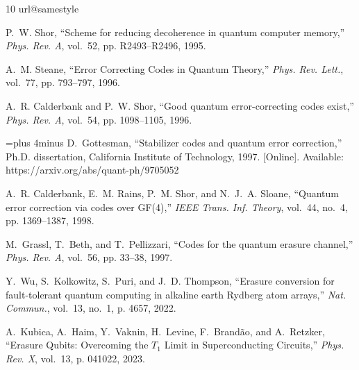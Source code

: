 \documentclass[]{amsart}
\begin{document}
\begin{thebibliography}{10}
\providecommand{\url}[1]{#1}
\csname url@samestyle\endcsname
\providecommand{\newblock}{\relax}
\providecommand{\bibinfo}[2]{#2}
\providecommand{\BIBentrySTDinterwordspacing}{\spaceskip=0pt\relax}
\providecommand{\BIBentryALTinterwordstretchfactor}{4}
\providecommand{\BIBentryALTinterwordspacing}{\spaceskip=\fontdimen2\font plus
\BIBentryALTinterwordstretchfactor\fontdimen3\font minus \fontdimen4\font\relax}
\providecommand{\BIBforeignlanguage}[2]{{%
\expandafter\ifx\csname l@#1\endcsname\relax
\typeout{** WARNING: IEEEtran.bst: No hyphenation pattern has been}%
\typeout{** loaded for the language `#1'. Using the pattern for}%
\typeout{** the default language instead.}%
\else
\language=\csname l@#1\endcsname
\fi
#2}}
\providecommand{\BIBdecl}{\relax}
\BIBdecl

P.~W. Shor, ``{Scheme for reducing decoherence in quantum computer memory},'' \emph{Phys. Rev. A}, vol.~52, pp. R2493--R2496, 1995.

A.~M. Steane, ``{Error Correcting Codes in Quantum Theory},'' \emph{Phys. Rev. Lett.}, vol.~77, pp. 793--797, 1996.

A.~R. Calderbank and P.~W. Shor, ``{Good quantum error-correcting codes exist},'' \emph{Phys. Rev. A}, vol.~54, pp. 1098--1105, 1996.

\BIBentryALTinterwordspacing
D.~Gottesman, ``Stabilizer codes and quantum error correction,'' Ph.D. dissertation, California Institute of Technology, 1997. [Online]. Available: \url{https://arxiv.org/abs/quant-ph/9705052}
\BIBentrySTDinterwordspacing

A.~R. Calderbank, E.~M. Rains, P.~M. Shor, and N.~J.~A. Sloane, ``{Quantum error correction via codes over GF(4)},'' \emph{IEEE Trans. Inf. Theory}, vol.~44, no.~4, pp. 1369--1387, 1998.

M.~Grassl, T.~Beth, and T.~Pellizzari, ``{Codes for the quantum erasure channel},'' \emph{Phys. Rev. A}, vol.~56, pp. 33--38, 1997.

Y.~Wu, S.~Kolkowitz, S.~Puri, and J.~D. Thompson, ``{Erasure conversion for fault-tolerant quantum computing in alkaline earth Rydberg atom arrays},'' \emph{Nat. Commun.}, vol.~13, no.~1, p. 4657, 2022.

A.~Kubica, A.~Haim, Y.~Vaknin, H.~Levine, F.~Brand\~ao, and A.~Retzker, ``{Erasure Qubits: Overcoming the ${T}_{1}$ Limit in Superconducting Circuits},'' \emph{Phys. Rev. X}, vol.~13, p. 041022, 2023.


\end{thebibliography}
\end{document}
